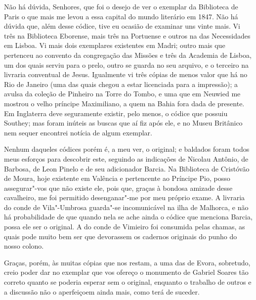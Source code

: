 \begin{linenumbers}
Não há dúvida, Senhores, que foi o desejo de ver o exemplar da 
Biblioteca de Paris o que mais me levou a essa capital do mundo 
literário em 1847. Não há dúvida que, além desse códice, tive eu ocasião 
de examinar uns vinte mais. Vi três na Biblioteca Eborense, mais três na 
Portuense e outros na das Necessidades em Lisboa. Vi mais dois 
exemplares existentes em Madri; outro mais que pertenceu ao convento 
da congregação das Missões e três da Academia de Lisboa, um dos 
quais serviu para o prelo, outro se guarda no seu arquivo, e o terceiro na 
livraria conventual de Jesus. Igualmente vi três cópias de menos valor 
que há no Rio de Janeiro (uma das quais chegou a estar licenciada para a 
impressão); a avulsa da coleção de Pinheiro na Torre do Tombo, e uma 
que em Neuwied me mostrou o velho príncipe Maximiliano, a quem na 
Bahia fora dada de presente. Em Inglaterra deve seguramente existir, 
pelo menos, o códice que possuiu Southey; mas foram inúteis as buscas 
que aí fiz após ele, e no Museu Britânico nem sequer encontrei notícia 
de algum exemplar.

Nenhum daqueles códices porém é, a meu ver, o original; e 
baldados foram todos meus esforços para descobrir este, seguindo as 
indicações de Nicolau Antônio, de Barbosa, de Leon Pinelo e de seu 
adicionador Barcia. Na Biblioteca de Cristóvão de Moura, hoje existente 
em Valência e pertencente ao Príncipe Pio, posso assegurar"-vos que não 
existe ele, pois que, graças à bondosa amizade desse cavalheiro, me foi 
permitido desenganar"-me por meu próprio exame. A livraria do conde 
de Vila"-Umbrosa guarda"-se incomunicável na ilha de Malhorca, e não 
há probabilidade de que quando nela se ache ainda o códice que 
menciona Barcia, possa ele ser o original. A do conde de Vimieiro foi 
consumida pelas chamas, as quais pode muito bem ser que devorassem 
os cadernos originais do punho do nosso colono.

Graças, porém, às muitas cópias que nos restam, a uma das de 
Evora, sobretudo, creio poder dar no exemplar que vos ofereço o 
monumento de Gabriel Soares tão correto quanto se poderia esperar sem 
o original, enquanto o trabalho de outros e a discussão não o 
aperfeiçoem ainda mais, como terá de suceder.


\end{linenumbers}
